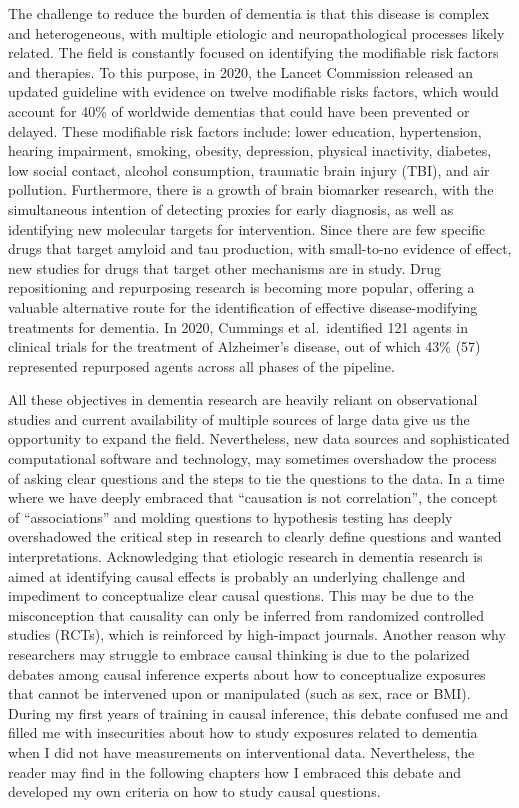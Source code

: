 \documentclass[
]{book}
\begin{document}
The challenge to reduce the burden of dementia is that this disease is complex and heterogeneous, with multiple etiologic and neuropathological processes likely related. The field is constantly focused on identifying the modifiable risk factors and therapies. To this purpose, in 2020, the Lancet Commission released an updated guideline with evidence on twelve modifiable risks factors, which would account for 40\% of worldwide dementias that could have been prevented or delayed. These modifiable risk factors include: lower education, hypertension, hearing impairment, smoking, obesity, depression, physical inactivity, diabetes, low social contact, alcohol consumption, traumatic brain injury (TBI), and air pollution\autocite{lancet2020}. Furthermore, there is a growth of brain biomarker research, with the simultaneous intention of detecting proxies for early diagnosis, as well as identifying new molecular targets for intervention. Since there are few specific drugs that target amyloid and tau production, with small-to-no evidence of effect, new studies for drugs that target other mechanisms are in study. Drug repositioning and repurposing research is becoming more popular, offering a valuable alternative route for the identification of effective disease-modifying treatments for dementia\autocite{ballard2020,langedijk2015}. In 2020, Cummings et al.~identified 121 agents in clinical trials for the treatment of Alzheimer's disease, out of which 43\% (57) represented repurposed agents across all phases of the pipeline\autocite{cummings2020}.

All these objectives in dementia research are heavily reliant on observational studies and current availability of multiple sources of large data give us the opportunity to expand the field. Nevertheless, new data sources and sophisticated computational software and technology, may sometimes overshadow the process of asking clear questions and the steps to tie the questions to the data. In a time where we have deeply embraced that ``causation is not correlation'', the concept of ``associations'' and molding questions to hypothesis testing has deeply overshadowed the critical step in research to clearly define questions and wanted interpretations. Acknowledging that etiologic research in dementia research is aimed at identifying causal effects is probably an underlying challenge and impediment to conceptualize clear causal questions. This may be due to the misconception that causality can only be inferred from randomized controlled studies (RCTs), which is reinforced by high-impact journals\autocite{jama}. Another reason why researchers may struggle to embrace causal thinking is due to the polarized debates among causal inference experts about how to conceptualize exposures that cannot be intervened upon or manipulated (such as sex, race or BMI)\autocite{waterkills,schwartz2016}. During my first years of training in causal inference, this debate confused me and filled me with insecurities about how to study exposures related to dementia when I did not have measurements on interventional data. Nevertheless, the reader may find in the following chapters how I embraced this debate and developed my own criteria on how to study causal questions.
\end{document}
